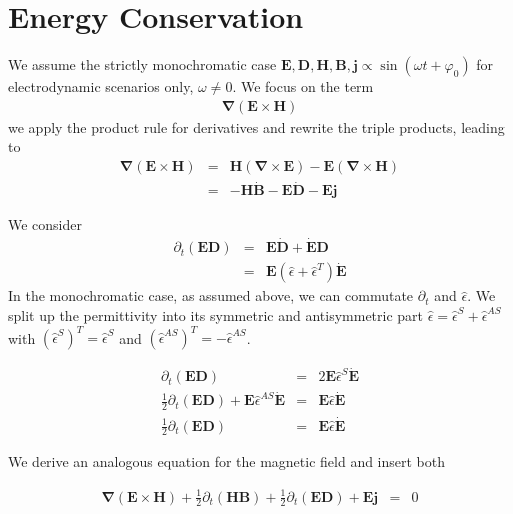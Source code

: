 \documentclass[12pt,a4paper,twoside,openright,BCOR10mm,headsepline,titlepage,abstracton,chapterprefix,final]{scrreprt}
\newcommand\Vector[1]{{\mathbf{#1}}}
\newcommand\Nabla{\Vector{\nabla}}
\newcommand\timederivative[1]{\dot{{#1}}}
\newcommand\Tensor[1]{\hat{#1}}
\newcommand\scalarEfield{E}
\newcommand\scalarBfield{B}
\newcommand\scalarHfield{H}
\newcommand\scalarDfield{D}
\newcommand\Efield{\Vector{\scalarEfield}}
\newcommand\Bfield{\Vector{\scalarBfield}}
\newcommand\Hfield{\Vector{\scalarHfield}}
\newcommand\Dfield{\Vector{\scalarDfield}}
\newcommand\permittivity{\Tensor{\epsilon}}
\newcommand\currentdensity{\Vector{j}}
\begin{document}
\section{Energy Conservation}
We assume the strictly monochromatic case $\Efield,\Dfield,\Hfield,\Bfield, \currentdensity \propto \sin(\omega t + \varphi_0)$ for electrodynamic scenarios only, $\omega \neq 0$.
We focus on the term
\begin{eqnarray}
   \Nabla ( \Efield \times \Hfield )
\end{eqnarray}
we apply the product rule for derivatives and rewrite the triple products, leading to
\begin{eqnarray}
   \Nabla ( \Efield \times \Hfield ) &=& \Hfield ( \Nabla \times \Efield ) - \Efield ( \Nabla \times \Hfield ) \\
   &=& - \Hfield \timederivative{\Bfield} - \Efield  \timederivative{\Dfield} - \Efield \currentdensity
\end{eqnarray}

We consider
\begin{eqnarray}
 \partial_t (\Efield \Dfield) &=& \Efield  \timederivative{\Dfield} +  \timederivative{\Efield} \Dfield \\
                              &=& \Efield ( \permittivity + \permittivity^T ) \timederivative{\Efield} 
\end{eqnarray}
In the monochromatic case, as assumed above, we can commutate $\partial_t$ and $\permittivity$.
We split up the permittivity into its symmetric and antisymmetric part $\permittivity =  \permittivity^S +  \permittivity^{AS}$ with
$(\permittivity^S)^T = \permittivity^S$ and $(\permittivity^{AS})^T = - \permittivity^{AS}$. 

\begin{eqnarray}
 \partial_t (\Efield \Dfield)                                                                  &=& 2 \Efield \permittivity^S \timederivative{\Efield} \\
 \frac{1}{2} \partial_t (\Efield \Dfield)+ \Efield \permittivity^{AS} \timederivative{\Efield} &=&   \Efield  \permittivity \timederivative{\Efield} \\
 \frac{1}{2} \partial_t (\Efield \Dfield)                                                      &=&   \Efield  \permittivity \timederivative{\Efield}
\end{eqnarray}

We derive an analogous equation for the magnetic field and insert both

\begin{eqnarray}
   \Nabla ( \Efield \times \Hfield ) + \frac{1}{2} \partial_t (\Hfield \Bfield) + \frac{1}{2} \partial_t (\Efield \Dfield) + \Efield \currentdensity &=& 0
\end{eqnarray}
\end{document}
